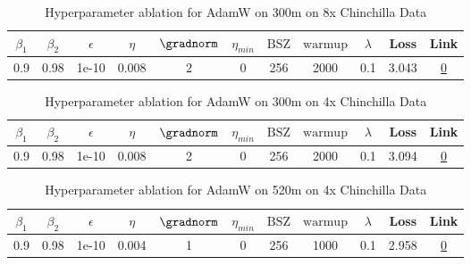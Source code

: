 \begin{table}[H]
\centering
\caption{Hyperparameter ablation for AdamW on 300m on 8x Chinchilla Data}
\label{tab:ablation_adamw_300m_8}
\begin{tabular}{ccccccccccc}
\toprule
$\beta_1$ & $\beta_2$ & $\epsilon$ & $\eta$ & $\gradnorm$ & $\eta_{min}$ & $\mathrm{BSZ}$ & $\mathrm{warmup}$ & $\lambda$ & Loss & Link \\
\midrule
0.9 & 0.98 & 1e-10 & 0.008 & 2 & 0 & 256 & 2000 & 0.1 & 3.043 & \href{https://wandb.ai/stanford-mercury/optimizer-scaling/runs/sweep-300m-48B-adamw07fc6elr0.008-wd0.1-minlr0-warmup2000-b10.9--b38246}{0} \\
\midrule
\bottomrule
\end{tabular}
\end{table}

\begin{table}[H]
\centering
\caption{Hyperparameter ablation for AdamW on 300m on 4x Chinchilla Data}
\label{tab:ablation_adamw_300m_4}
\begin{tabular}{ccccccccccc}
\toprule
$\beta_1$ & $\beta_2$ & $\epsilon$ & $\eta$ & $\gradnorm$ & $\eta_{min}$ & $\mathrm{BSZ}$ & $\mathrm{warmup}$ & $\lambda$ & Loss & Link \\
\midrule
0.9 & 0.98 & 1e-10 & 0.008 & 2 & 0 & 256 & 2000 & 0.1 & 3.094 & \href{https://wandb.ai/stanford-mercury/optimizer-scaling/runs/sweep-300m-24B-adamw5dcabdlr0.008-wd0.1-minlr0-warmup2000-b10.9--5e75fb}{0} \\
\midrule
\bottomrule
\end{tabular}
\end{table}

\begin{table}[H]
\centering
\caption{Hyperparameter ablation for AdamW on 520m on 4x Chinchilla Data}
\label{tab:ablation_adamw_520m_4}
\begin{tabular}{ccccccccccc}
\toprule
$\beta_1$ & $\beta_2$ & $\epsilon$ & $\eta$ & $\gradnorm$ & $\eta_{min}$ & $\mathrm{BSZ}$ & $\mathrm{warmup}$ & $\lambda$ & Loss & Link \\
\midrule
0.9 & 0.98 & 1e-10 & 0.004 & 1 & 0 & 256 & 1000 & 0.1 & 2.958 & \href{https://wandb.ai/stanford-mercury/optimizer-scaling/runs/sweep-520m-42B-adamwbc2b89lr0.004-wd0.1-minlr0-warmup1000-b10.9--50dbd9}{0} \\
\midrule
\bottomrule
\end{tabular}
\end{table}

